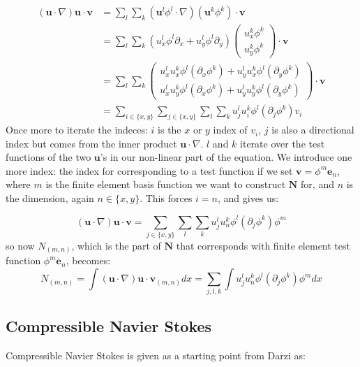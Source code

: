 \documentclass{article}
\begin{document}
\begin{align*}
    (\mathbf{u}\cdot \nabla)\mathbf{u}\cdot \mathbf{v} 
    &= \sum_l\sum_k\left( 
        \mathbf{u}^l\phi^l\cdot\nabla
    \right)
    (\mathbf{u}^k\phi^k) \cdot \mathbf{v}\\
    &= \sum_l\sum_k\left( 
        u_x^l\phi^l\partial_x+u_y^l\phi^l\partial_y
    \right)
    \begin{pmatrix}
        u^k_x\phi^k\\
        u^k_y\phi^k
    \end{pmatrix}
    \cdot \mathbf{v}\\
    &= \sum_l\sum_k 
    \begin{pmatrix}
        u_x^lu_x^k\phi^l(\partial_x\phi^k)+u_y^lu_x^k\phi^l(\partial_y\phi^k) \\
        u_x^lu_y^k\phi^l(\partial_x\phi^k)+u_y^lu_y^k\phi^l(\partial_y\phi^k) 
    \end{pmatrix}
    \cdot
    \mathbf{v} \\
    &= \sum_{i\in\{x,y\}}\sum_{j\in\{x,y\}}\sum_l\sum_k u_j^lu_i^k\phi^l(\partial_j\phi^k)v_i
\end{align*}
Once more to iterate the indeces: $i$ is the $x$ or $y$ index of $v_i$, $j$ is also a directional index but comes from the inner product $\mathbf{u}\cdot\nabla$. $l$ and $k$ iterate over the test functions of the two $\mathbf{u}$'s in our non-linear part of the equation. We introduce one more index: the index for corresponding to a test function if we set $\mathbf{v}=\phi^m\mathbf{e}_n$, where $m$ is the finite element basis function we want to construct $\mathbf{N}$ for, and $n$ is the dimension, again $n\in\{x,y\}$. This forces $i=n$, and gives us:

\begin{equation*}
    (\mathbf{u}\cdot \nabla)\mathbf{u}\cdot \mathbf{v} = \sum_{j\in\{x,y\}}\sum_l\sum_k u_j^lu_n^k\phi^l(\partial_j\phi^k)\phi^m
\end{equation*}
so now ${N_{(m,n)}}$, which is the part of $\mathbf{N}$ that corresponds with finite element test function $\phi^m\mathbf{e}_n$, becomes:
\begin{equation}\label{eq:Navier_non_linear_Nmn}
    N_{(m,n)}=\int (\mathbf{u}\cdot \nabla)\mathbf{u}\cdot \mathbf{v}_{(m,n)}dx = \sum_{j, l, k}\int u_j^lu_n^k\phi^l(\partial_j\phi^k)\phi^m dx
\end{equation}


\subsection*{Compressible Navier Stokes}
Compressible Navier Stokes is given as a starting point from Darzi as:
\end{document}

